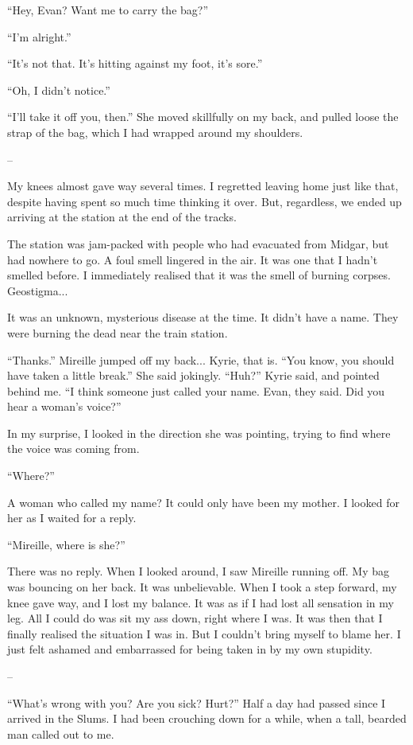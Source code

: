 \documentclass[oneside]{book}
\begin{document}
“Hey, Evan? Want me to carry the bag?”

“I’m alright.”

“It’s not that. It’s hitting against my foot, it’s sore.”

“Oh, I didn’t notice.”

“I’ll take it off you, then.” She moved skillfully on my back, and pulled loose the strap of the bag, which I had wrapped around my shoulders.

–

My knees almost gave way several times. I regretted leaving home just like that, despite having spent so much time thinking it over. But, regardless, we ended up arriving at the station at the end of the tracks.

The station was jam-packed with people who had evacuated from Midgar, but had nowhere to go. A foul smell lingered in the air. It was one that I hadn’t smelled before. I immediately realised that it was the smell of burning corpses. Geostigma...

It was an unknown, mysterious disease at the time. It didn’t have a name. They were burning the dead near the train station.

“Thanks.” Mireille jumped off my back... Kyrie, that is. “You know, you should have taken a little break.” She said jokingly. “Huh?” Kyrie said, and pointed behind me. “I think someone just called your name. Evan, they said. Did you hear a woman’s voice?”

In my surprise, I looked in the direction she was pointing, trying to find where the voice was coming from.

“Where?”

A woman who called my name? It could only have been my mother. I looked for her as I waited for a reply.

“Mireille, where is she?”

There was no reply. When I looked around, I saw Mireille running off. My bag was bouncing on her back. It was unbelievable. When I took a step forward, my knee gave way, and I lost my balance. It was as if I had lost all sensation in my leg. All I could do was sit my ass down, right where I was. It was then that I finally realised the situation I was in. But I couldn’t bring myself to blame her. I just felt ashamed and embarrassed for being taken in by my own stupidity.

–

“What’s wrong with you? Are you sick? Hurt?” Half a day had passed since I arrived in the Slums. I had been crouching down for a while, when a tall, bearded man called out to me.
\end{document}
